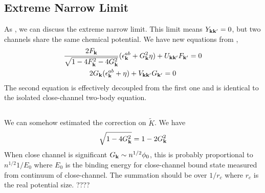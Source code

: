 \subsection{Extreme Narrow Limit}
As \cite{GurarieNarrow}, we can discuss the extreme narrow limit.  This limit means $Y_{\mathbf{k}\mathbf{k}'}=0$, but two channels share the same chemical potential.  We have new equations from ,
\begin{subequations}\label{eq:20100927:gapExtreme}
\begin{gather}\label{eq:20100927:gapa}
\frac{2F_{\mathbf{k}}}{\sqrt{1-4 F_{\mathbf{k}}^2-4 G_{\mathbf{k}}^2}} (\epsilon^{ab}_{\mathbf{k}}+  G_{\mathbf{k}}^2\eta)+U_{\mathbf{k}\mathbf{k}'}F_{\mathbf{k}'}=0\\
\label{eq:20100927:gapb}
{2G_{\ensuremath{\mathbf{k}}}}(\epsilon^{ab}_{\mathbf{k}}+\eta)+V_{\mathbf{k}\mathbf{k}'}G_{\mathbf{k}'}=0
\end{gather}
\end{subequations}
The second equation is effectively decoupled from the first one and is identical to the isolated close-channel two-body \sch equation. 

\subsection{}
We can somehow estimated the  correction on $\tilde{K}$.  We have 
\[\sqrt{1-4G_{\mathbf{k}}^{2}}=1-2G_{\mathbf{k}}^{2}\]
When close channel is significant $G_{\mathbf{k}}\sim{n^{1/2}\phi_{0}}$, this is probably proportional to $n^{1/2}1/E_{0}$ where $E_{0}$ is the binding energy for close-channel bound state measured from continuum of close-channel.  The summation should be over $1/r_{c}$ where $r_{c}$ is the real potential size.  ????
